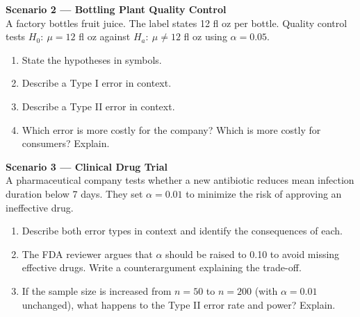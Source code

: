 \documentclass[10pt]{article}
\begin{document}
\begin{tcolorbox}[colback=white, colframe=black!40, title=\textbf{Tier A --- Approaching Proficiency},
    fonttitle=\bfseries, arc=2mm, left=3mm, right=3mm, top=2mm, bottom=2mm]

\textbf{Scenario 2 --- Bottling Plant Quality Control}\\
A factory bottles fruit juice. The label states 12 fl oz per bottle. Quality control
tests $H_0{:}\ \mu = 12$ fl oz against $H_a{:}\ \mu \ne 12$ fl oz using $\alpha = 0.05$.

\begin{enumerate}[label=\alph*.]
  \item State the hypotheses in symbols. \writeline

  \item Describe a Type I error in context. 

  \item Describe a Type II error in context. 

  \item Which error is more costly for the company? Which is more costly for
        consumers? Explain. 
\end{enumerate}
\end{tcolorbox}

\begin{tcolorbox}[colback=white, colframe=black!40, title=\textbf{Tier E --- Extension},
    fonttitle=\bfseries, arc=2mm, left=3mm, right=3mm, top=2mm, bottom=2mm]

\textbf{Scenario 3 --- Clinical Drug Trial}\\
A pharmaceutical company tests whether a new antibiotic reduces mean infection duration
below 7 days. They set $\alpha = 0.01$ to minimize the risk of approving an ineffective drug.

\begin{enumerate}[label=\alph*.]
  \item Describe both error types in context and identify the consequences of each. 

  \item The FDA reviewer argues that $\alpha$ should be raised to 0.10 to avoid missing
        effective drugs. Write a counterargument explaining the trade-off. 

  \item If the sample size is increased from $n = 50$ to $n = 200$ (with $\alpha = 0.01$
        unchanged), what happens to the Type II error rate and power? Explain. 
\end{enumerate}
\end{tcolorbox}
\end{document}
